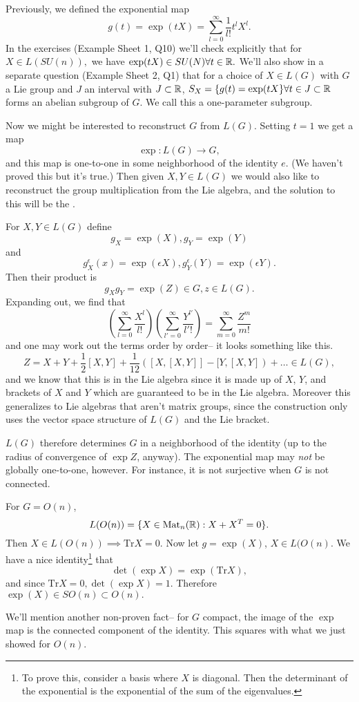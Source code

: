 Previously, we defined the exponential map
$$g(t)=\exp(tX)=\sum_{l=0}^\infty \frac{1}{l!}t^l X^l.$$ In the exercises (Example Sheet 1, Q10) we'll check explicitly that for $X\in L(SU(n)),$ we have $\exp(tX)\in SU(N) \forall t\in \mathbb{R}.$ We'll also show in a separate question (Example Sheet 2, Q1) that for a choice of $X\in L(G)$ with $G$ a Lie group and $J$ an interval with $J\subset \mathbb{R}$, $S_X=\{g(t)=\exp(tX\} \forall t \in J \subset \mathbb{R}$ forms an abelian subgroup of $G$. We call this a one-parameter subgroup.

Now we might be interested to reconstruct $G$ from $L(G)$. Setting $t=1$ we get a map $$\exp:L(G)\to G,$$ and this map is one-to-one in some neighborhood of the identity $e$. (We haven't proved this but it's true.) Then given $X,Y\in L(G)$ we would also like to reconstruct the group multiplication from the Lie algebra, and the solution to this will be the .

For $X,Y\in L(G)$ define
$$g_X=\exp(X), g_Y=\exp(Y)$$
and
$$g_X^\epsilon(x)=\exp(\epsilon X), g_Y^\epsilon(Y)=\exp (\epsilon Y).$$
Then their product is
$$g_X g_Y= \exp(Z)\in G, z\in L(G).$$ Expanding out, we find that
$$\left(\sum_{l=0}^\infty \frac{X^l}{l!}\right)\left(\sum_{l'=0}^\infty \frac{Y^{l'}}{l' !}\right)=\sum_{m=0}^\infty \frac{Z^m}{m!}$$
and one may work out the terms order by order-- it looks something like this.
$$Z=X+Y+\frac{1}{2}[X,Y]+\frac{1}{12}([X,[X,Y]]-[Y,[X,Y])+\ldots \in L(G),$$
and we know that this is in the Lie algebra since it is made up of $X$, $Y$, and brackets of $X$ and $Y$ which are guaranteed to be in the Lie algebra. Moreover this generalizes to Lie algebras that aren't matrix groups, since the construction only uses the vector space structure of $L(G)$ and the Lie bracket.

$L(G)$ therefore determines $G$ in a neighborhood of the identity (up to the radius of convergence of $\exp Z$, anyway). The exponential map may \emph{not} be globally one-to-one, however. For instance, it is not surjective when $G$ is not connected.
\begin{exm}
For $G=O(n)$, 
$$L(O(n))=\{X\in \text{Mat}_n(\mathbb{R}): X+X^T=0\}.$$ 
Then $X\in L(O(n)) \implies \text{Tr} X=0.$ Now let $g=\exp(X)$, $X\in L(O(n)$. We have a nice identity\footnote{To prove this, consider a basis where $X$ is diagonal. Then the determinant of the exponential  is the exponential of the sum of the eigenvalues.} that
$$\det (\exp X) = \exp(\text{Tr} X),$$
and since $\text{Tr} X = 0, \det (\exp X) = 1$. Therefore $\exp(X)\in SO(n) \subset O(n).$

We'll mention another non-proven fact-- for $G$ compact, the image of the $\exp$ map is the connected component of the identity. This squares with what we just showed for $O(n).$
\end{exm}

